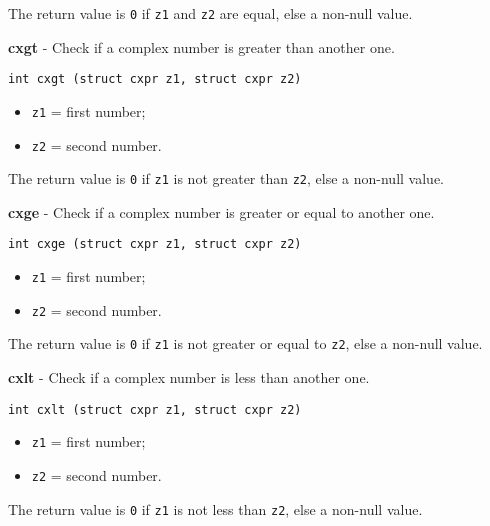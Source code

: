 \documentclass{article}
\begin{document}
The return value is \texttt{0} if \texttt{z1} and \texttt{z2} are equal, else
a non-null value.


\hrulefill{}

\textbf{cxgt} - Check if a complex number is greater than another one.

\begin{verbatim}
int cxgt (struct cxpr z1, struct cxpr z2)
\end{verbatim}

\begin{itemize}
\item \texttt{z1} = first number;
\item \texttt{z2} = second number.
\end{itemize}

The return value is \texttt{0} if \texttt{z1} is not greater than \texttt{z2}, 
else a non-null value.


\hrulefill{}

\textbf{cxge} - Check if a complex number is greater or equal to another one.

\begin{verbatim}
int cxge (struct cxpr z1, struct cxpr z2)
\end{verbatim}

\begin{itemize}
\item \texttt{z1} = first number;
\item \texttt{z2} = second number.
\end{itemize}

The return value is \texttt{0} if \texttt{z1} is not greater or equal to \texttt{z2},
else a non-null value.


\hrulefill{}

\textbf{cxlt} - Check if a complex number is less than another one.

\begin{verbatim}
int cxlt (struct cxpr z1, struct cxpr z2)
\end{verbatim}

\begin{itemize}
\item \texttt{z1} = first number;
\item \texttt{z2} = second number.
\end{itemize}

The return value is \texttt{0} if \texttt{z1} is not less than \texttt{z2},
else a non-null value.


\hrulefill{}
\end{document}
